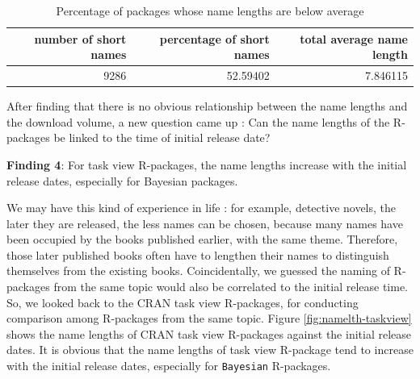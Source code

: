 \documentclass[
]{book}
\newenvironment{discovery}[1]{%
  \begin{tcolorbox}[colback=blue!30,colframe=blue!80!black]#1}{\end{tcolorbox}}
\begin{document}
\begin{table}

\caption{\label{tab:pct-lngname}Percentage of packages whose name lengths are below average}
\centering
\begin{tabular}[t]{r|r|r}
\hline
number of short names & percentage of short names & total average name length\\
\hline
9286 & 52.59402 & 7.846115\\
\hline
\end{tabular}
\end{table}

After finding that there is no obvious relationship between the name lengths and the download volume, a new question came up : Can the name lengths of the R-packages be linked to the time of initial release date?

\begin{discovery}
\textbf{Finding 4}: For task view R-packages, the name lengths increase
with the initial release dates, especially for Bayesian packages.
\end{discovery}

We may have this kind of experience in life : for example, detective novels, the later they are released, the less names can be chosen, because many names have been occupied by the books published earlier, with the same theme. Therefore, those later published books often have to lengthen their names to distinguish themselves from the existing books. Coincidentally, we guessed the naming of R-packages from the same topic would also be correlated to the initial release time. So, we looked back to the CRAN task view R-packages\autocite{crantaskviews}, for conducting comparison among R-packages from the same topic. Figure \ref{fig:namelth-taskview} shows the name lengths of CRAN task view R-packages against the initial release dates. It is obvious that the name lengths of task view R-package tend to increase with the initial release dates, especially for \texttt{Bayesian} R-packages.
\end{document}
